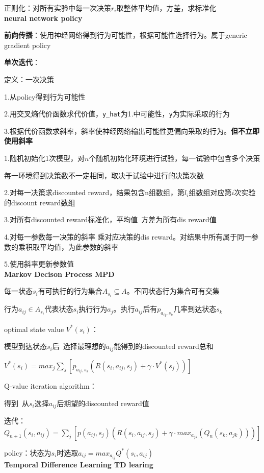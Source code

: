 \documentclass[UTF8]{ctexart}
\begin{document}
  \quad 正则化：对所有实验中每一次决策$r_i$取整体平均值，方差，求标准化\\
\textbf{neural network policy}

  \textbf{前向传播}：使用神经网络得到行为可能性，根据可能性选择行为。属于generic gradient policy

  \textbf{单次迭代}：

  \quad 定义：一次决策

  \quad \quad 1.从policy得到行为可能性

  \quad \quad 2.用交叉熵代价函数求代价值，\texttt{y\_hat}为1.中可能性，\texttt{y}为实际采取的行为

  \quad \quad 3.根据代价函数求斜率，斜率使神经网络输出可能性更偏向采取的行为。\textbf{但不立即使用斜率}

  \quad 1.随机初始化1次模型，对$n$个随机初始化环境进行试验，每一试验中包含多个决策
  
  \quad \quad 每一环境得到决策数不一定相同，取决于试验中进行的决策次数

  \quad 2.对每一决策求discounted reward，结果包含n组数组，第$l_i$组数组对应第$i$次实验的discount reward数组

  \quad 3.对所有discounted reward标准化，平均值\ 方差为所有dis reward值
  
  \quad 4.对每一参数每一决策的斜率 乘对应决策的dis reward。对结果中所有属于同一参数的乘积取平均值，为此参数的斜率

  \quad 5.使用斜率更新参数值\\
\textbf{Markov Decison Process MPD}

  每一状态$s_i$有可执行的行为集合$A_{s_i} \subseteq A$。不同状态行为集合可有交集

  行为$a_{ij} \in A_{s_i}$代表状态$s_i$执行行为$a_j$。执行$a_{ij}$后有$p_{a_{ij}, s_k}$几率到达状态$s_k$

  optimal state value $V^*(s_i)$：
  
  \quad 模型到达状态$s_i$后\ 选择最理想的$a_{ij}$能得到的discounted reward总和

  \quad $V^*(s_i) = max_j \sum_s [p_{a_{ij}, s_k} (R(s_i, a_{ij}, s_j) + \gamma \cdot V^*(s_j))]$
  
  Q-value iteration algorithm：

  \quad 得到\ 从$s_i$选择$a_{ij}$后期望的discounted reward值

  \quad 迭代：$Q_{n+1}(s_i, a_{ij}) = \sum_j [p(a_{ij}, s_j) (R(s_i, a_{ij}, s_j) + \gamma \cdot max_{a_{jk}} (Q_n(s_k, a_{jk})))]$
  
  policy：状态为$s_i$时选取$a_{ij} = max_{a_{ij}} Q^*(s_i, a_{ij})$\\
\textbf{Temporal Difference Learning TD learing}
\end{document}
